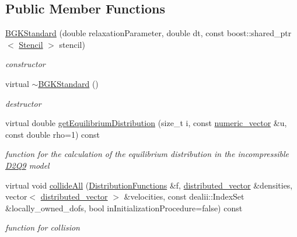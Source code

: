 \subsection*{Public Member Functions}
\begin{DoxyCompactItemize}
\item 
\hypertarget{classnatrium_1_1BGKStandard_a4c2b17997ae6e88b1d6be7b93f210fe7}{
\hyperlink{classnatrium_1_1BGKStandard_a4c2b17997ae6e88b1d6be7b93f210fe7}{BGKStandard} (double relaxationParameter, double dt, const boost::shared\_\-ptr$<$ \hyperlink{classnatrium_1_1Stencil}{Stencil} $>$ stencil)}
\label{classnatrium_1_1BGKStandard_a4c2b17997ae6e88b1d6be7b93f210fe7}

\begin{DoxyCompactList}\small\item\em constructor \item\end{DoxyCompactList}\item 
virtual \hyperlink{classnatrium_1_1BGKStandard_aa55035be79098a762cf4f0ef308d41e5}{$\sim$BGKStandard} ()
\begin{DoxyCompactList}\small\item\em destructor \item\end{DoxyCompactList}\item 
virtual double \hyperlink{classnatrium_1_1BGKStandard_a3d45ef2fe5536bf14914f99297477754}{getEquilibriumDistribution} (size\_\-t i, const \hyperlink{namespacenatrium_a67c39077adc6634f8fa3762b8eef24c4}{numeric\_\-vector} \&u, const double rho=1) const 
\begin{DoxyCompactList}\small\item\em function for the calculation of the equilibrium distribution in the incompressible \hyperlink{classnatrium_1_1D2Q9}{D2Q9} model \item\end{DoxyCompactList}\item 
virtual void \hyperlink{classnatrium_1_1BGKStandard_a8e0493b063d56275d7ee607e25c4145e}{collideAll} (\hyperlink{classnatrium_1_1DistributionFunctions}{DistributionFunctions} \&f, \hyperlink{namespacenatrium_a903d2b92917f582f2ff05f52160ab811}{distributed\_\-vector} \&densities, vector$<$ \hyperlink{namespacenatrium_a903d2b92917f582f2ff05f52160ab811}{distributed\_\-vector} $>$ \&velocities, const dealii::IndexSet \&locally\_\-owned\_\-dofs, bool inInitializationProcedure=false) const 
\begin{DoxyCompactList}\small\item\em function for collision \item\end{DoxyCompactList}\item 

\end{DoxyCompactItemize}
